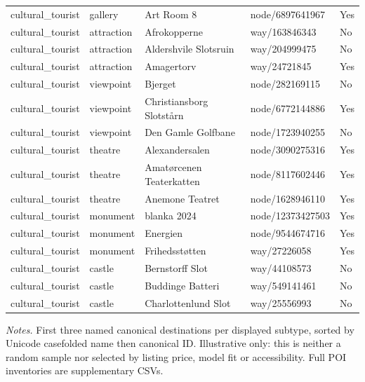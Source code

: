 \begin{landscape}
\begin{longtable}{>{\raggedright\arraybackslash}p{3.0cm}>{\raggedright\arraybackslash}p{2.7cm}>{\raggedright\arraybackslash}p{9.0cm}>{\raggedright\arraybackslash}p{3.7cm}>{\raggedright\arraybackslash}p{1.6cm}}
cultural\_\allowbreak{}tourist & gallery & Art Room 8 & node/6897641967 & Yes \\
cultural\_\allowbreak{}tourist & attraction & Afrokopperne & way/163846343 & No \\
cultural\_\allowbreak{}tourist & attraction & Aldershvile Slotsruin & way/204999475 & No \\
cultural\_\allowbreak{}tourist & attraction & Amagertorv & way/24721845 & Yes \\
cultural\_\allowbreak{}tourist & viewpoint & Bjerget & node/282169115 & No \\
cultural\_\allowbreak{}tourist & viewpoint & Christiansborg Slotstårn & node/6772144886 & Yes \\
cultural\_\allowbreak{}tourist & viewpoint & Den Gamle Golfbane & node/1723940255 & No \\
cultural\_\allowbreak{}tourist & theatre & Alexandersalen & node/3090275316 & Yes \\
cultural\_\allowbreak{}tourist & theatre & Amatørcenen Teaterkatten & node/8117602446 & Yes \\
cultural\_\allowbreak{}tourist & theatre & Anemone Teatret & node/1628946110 & Yes \\
cultural\_\allowbreak{}tourist & monument & blanka 2024 & node/12373427503 & Yes \\
cultural\_\allowbreak{}tourist & monument & Energien & node/9544674716 & Yes \\
cultural\_\allowbreak{}tourist & monument & Frihedsstøtten & way/27226058 & Yes \\
cultural\_\allowbreak{}tourist & castle & Bernstorff Slot & way/44108573 & No \\
cultural\_\allowbreak{}tourist & castle & Buddinge Batteri & way/549141461 & No \\
cultural\_\allowbreak{}tourist & castle & Charlottenlund Slot & way/25556993 & No \\
\bottomrule
\end{longtable}
{\footnotesize\noindent\emph{Notes.} First three named canonical destinations per displayed subtype, sorted by Unicode casefolded name then canonical ID. Illustrative only: this is neither a random sample nor selected by listing price, model fit or accessibility. Full POI inventories are supplementary CSVs.\par}
\end{landscape}
